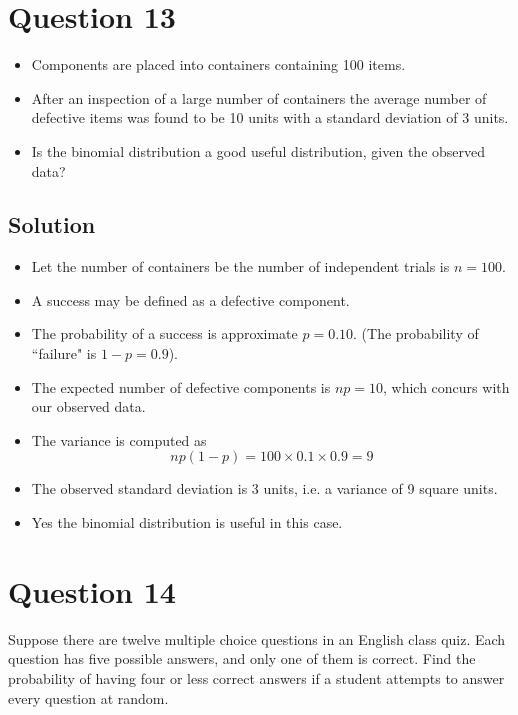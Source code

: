 \documentclass[a4paper,12pt]{article}
\begin{document}
\section*{Question 13}

\begin{itemize}
	\item Components are placed into containers containing 100 items.
	\item After an inspection of a large number of containers the average number of defective items was found to be 10 units with a standard deviation of 3 units.
	\item Is the binomial distribution a good useful distribution, given the observed data?
\end{itemize}




\subsection*{Solution}

\begin{itemize}
	\item Let the number of containers be the number of independent trials is $n=100$.
	\item A success may be defined as a defective component.
	\item The probability of a success is approximate $p=0.10$. (The probability of ``failure" is $1-p=0.9$).
	\item The expected number of defective components is $np=10$, which concurs with our observed data.
	\item The variance is computed as \[np(1-p) = 100 \times 0.1 \times 0.9 = 9\]
	\item The observed standard deviation is 3 units, i.e. a variance of 9 square units.
	\item Yes the binomial distribution is useful in this case.
\end{itemize}

\section*{Question 14}

Suppose there are twelve multiple choice questions in an English class quiz. Each question has five possible answers, and only one of them is correct. Find the probability of having four or less correct answers if a student attempts to answer every question at random.
\end{document}
